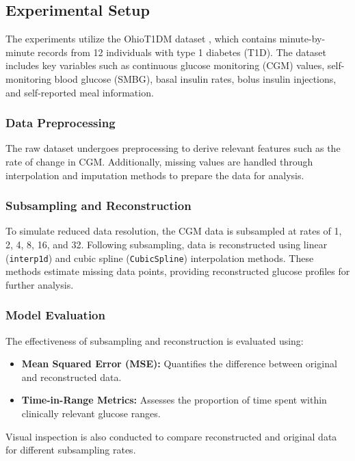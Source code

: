 \subsection{Experimental Setup}

The experiments utilize the OhioT1DM dataset \cite{ohioT1DM_dataset}, which contains minute-by-minute records from 12 individuals with type 1 diabetes (T1D). The dataset includes key variables such as continuous glucose monitoring (CGM) values, self-monitoring blood glucose (SMBG), basal insulin rates, bolus insulin injections, and self-reported meal information.

\subsubsection{Data Preprocessing}
The raw dataset undergoes preprocessing to derive relevant features such as the rate of change in CGM. Additionally, missing values are handled through interpolation and imputation methods to prepare the data for analysis.

\subsubsection{Subsampling and Reconstruction}
To simulate reduced data resolution, the CGM data is subsampled at rates of 1, 2, 4, 8, 16, and 32. Following subsampling, data is reconstructed using linear (\texttt{interp1d}) and cubic spline (\texttt{CubicSpline}) interpolation methods. These methods estimate missing data points, providing reconstructed glucose profiles for further analysis.

\subsubsection{Model Evaluation}
The effectiveness of subsampling and reconstruction is evaluated using:
\begin{itemize}
	\item \textbf{Mean Squared Error (MSE):} Quantifies the difference between original and reconstructed data.
	\item \textbf{Time-in-Range Metrics:} Assesses the proportion of time spent within clinically relevant glucose ranges.
\end{itemize}
Visual inspection is also conducted to compare reconstructed and original data for different subsampling rates.


















